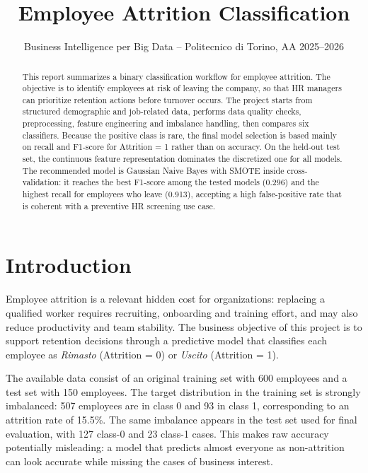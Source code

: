 \documentclass[lettersize,journal]{IEEEtran}
\begin{document}
\title{Employee Attrition Classification}

\author{Business Intelligence per Big Data -- Politecnico di Torino, AA 2025--2026}

\maketitle

\begin{abstract}
This report summarizes a binary classification workflow for employee attrition. The objective is to identify employees at risk of leaving the company, so that HR managers can prioritize retention actions before turnover occurs. The project starts from structured demographic and job-related data, performs data quality checks, preprocessing, feature engineering and imbalance handling, then compares six classifiers. Because the positive class is rare, the final model selection is based mainly on recall and F1-score for Attrition = 1 rather than on accuracy. On the held-out test set, the continuous feature representation dominates the discretized one for all models. The recommended model is Gaussian Naive Bayes with SMOTE inside cross-validation: it reaches the best F1-score among the tested models (0.296) and the highest recall for employees who leave (0.913), accepting a high false-positive rate that is coherent with a preventive HR screening use case.
\end{abstract}

\section{Introduction}
Employee attrition is a relevant hidden cost for organizations: replacing a qualified worker requires recruiting, onboarding and training effort, and may also reduce productivity and team stability. The business objective of this project is to support retention decisions through a predictive model that classifies each employee as \emph{Rimasto} (Attrition = 0) or \emph{Uscito} (Attrition = 1).

The available data consist of an original training set with 600 employees and a test set with 150 employees. The target distribution in the training set is strongly imbalanced: 507 employees are in class 0 and 93 in class 1, corresponding to an attrition rate of 15.5\%. The same imbalance appears in the test set used for final evaluation, with 127 class-0 and 23 class-1 cases. This makes raw accuracy potentially misleading: a model that predicts almost everyone as non-attrition can look accurate while missing the cases of business interest.
\end{document}
